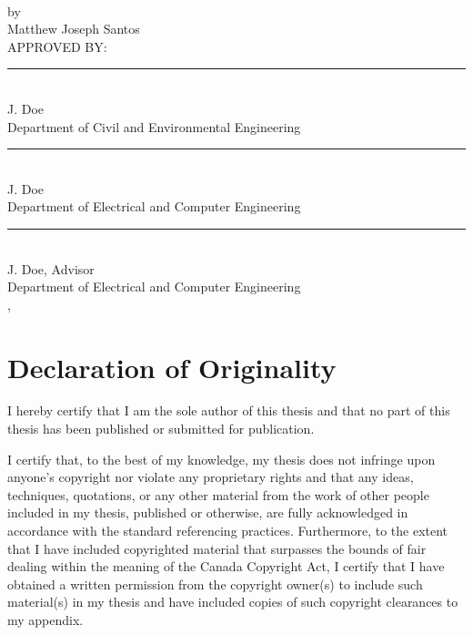 \begin{titlepage} %
	\begin{large}
		\begin{center}
			\vspace*{0.5cm}
			{\bfseries \LARGE \ThesisTitle{}}\\
			\vspace{1.5cm}
			by\\
			{Matthew Joseph Santos}\\
			\vspace{2cm}
			APPROVED BY:\\
			\vfill
			\rule{0.7\textwidth}{0.4pt}\\
			J. Doe\\
			Department of Civil and Environmental Engineering\\
			\vspace{1.5cm}
			\rule{0.7\textwidth}{0.4pt}\\
			J. Doe\\
			Department of Electrical and Computer Engineering\\
			\vspace{1.5cm}
			\rule{0.7\textwidth}{0.4pt}\\
			J. Doe, Advisor\\
			Department of Electrical and Computer Engineering\\
			\vspace{1cm}
			{\hfill \ThesisDefenceDate{}, \ThesisDefenceYear}
		\end{center}
	\end{large}
\end{titlepage}

\chapter*{Declaration of Originality}
\setcounter{page}{3}

I hereby certify that I am the sole author of this thesis and that no part of this thesis has been published or submitted for publication.

I certify that, to the best of my knowledge, my thesis does not infringe upon anyone’s copyright nor violate any proprietary rights and that any ideas, techniques, quotations, or any other material from the work of other people included in my thesis, published or otherwise, are fully acknowledged in accordance with the standard referencing practices. Furthermore, to the extent that I have included copyrighted material that surpasses the bounds of fair dealing within the meaning of the Canada Copyright Act, I certify that I have obtained a written permission from the copyright owner(s) to include such material(s) in my thesis and have included copies of such copyright clearances to my appendix.

